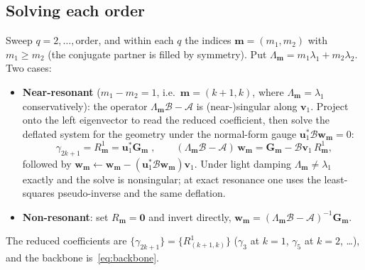 \subsection{Solving each order}
Sweep $q=2,\dots,\text{order}$, and within each $q$ the indices $\bm m=(m_1,m_2)$ with
$m_1\ge m_2$ (the conjugate partner is filled by symmetry). Put
$\Lambda_{\bm m}=m_1\lambda_1+m_2\lambda_2$. Two cases:
\begin{itemize}
\item \textbf{Near-resonant} ($m_1-m_2=1$, i.e.\ $\bm m=(k{+}1,k)$, where
$\Lambda_{\bm m}=\lambda_1$ conservatively): the operator $\Lambda_{\bm m}\bm{\mathcal B}
-\bm{\mathcal A}$ is (near-)singular along $\bm v_1$. Project onto the left eigenvector
to read the reduced coefficient, then solve the deflated system for the geometry under
the normal-form gauge $\bm u_1^{*}\bm{\mathcal B}\bm w_{\bm m}=0$:
\begin{equation}
\boxed{\;\gamma_{2k+1}=R^1_{\bm m}=\bm u_1^{*}\bm G_{\bm m}\;},\qquad
(\Lambda_{\bm m}\bm{\mathcal B}-\bm{\mathcal A})\,\bm w_{\bm m}
=\bm G_{\bm m}-\bm{\mathcal B}\bm v_1\,R^1_{\bm m},
\label{eq:app-gamma}
\end{equation}
followed by $\bm w_{\bm m}\!\leftarrow\!\bm w_{\bm m}-(\bm u_1^{*}\bm{\mathcal B}\bm w_{\bm m})\bm v_1$.
Under light damping $\Lambda_{\bm m}\ne\lambda_1$ exactly and the solve is nonsingular; at
exact resonance one uses the least-squares pseudo-inverse and the same deflation.
\item \textbf{Non-resonant}: set $R_{\bm m}=\bm 0$ and invert directly,
$\bm w_{\bm m}=(\Lambda_{\bm m}\bm{\mathcal B}-\bm{\mathcal A})^{-1}\bm G_{\bm m}$.
\end{itemize}
The reduced coefficients are $\{\gamma_{2k+1}\}=\{R^1_{(k+1,k)}\}$ ($\gamma_3$ at
$k{=}1$, $\gamma_5$ at $k{=}2$, \dots), and the backbone is~\eqref{eq:backbone}.

